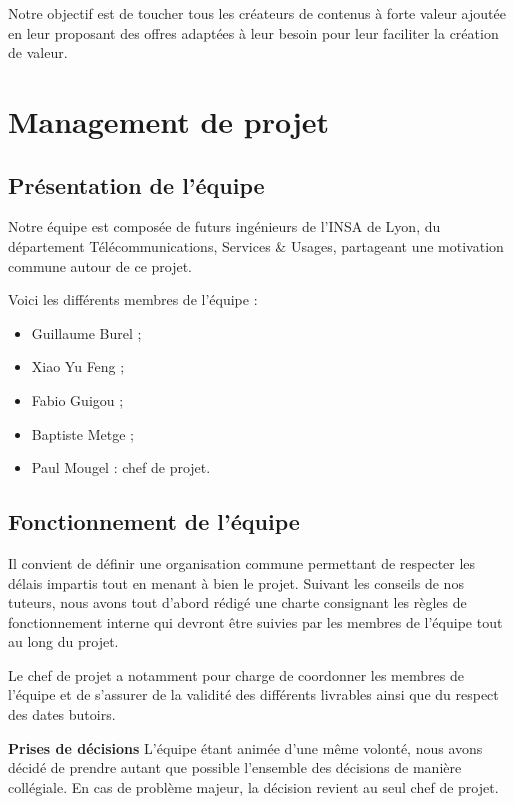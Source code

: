 \documentclass[10pt,twocolumn,a4paper,utf8x]{article}
\begin{document}
Notre objectif est de toucher tous les créateurs de contenus à forte
valeur ajoutée en leur proposant des offres adaptées à leur besoin pour
leur faciliter la création de valeur.

\section{Management de projet}

\subsection{Présentation de l'équipe}

Notre équipe est composée de futurs ingénieurs de l'INSA de Lyon, du
département Télécommunications, Services \& Usages, partageant une
motivation commune autour de ce projet.

Voici les différents membres de l'équipe :

\begin{itemize}
\itemsep1pt\parskip0pt
\item
  Guillaume Burel ;
\item
  Xiao Yu Feng ;
\item
  Fabio Guigou ;
\item
  Baptiste Metge ;
\item
  Paul Mougel : chef de projet.
\end{itemize}

\subsection{Fonctionnement de l'équipe}

Il convient de définir une organisation commune permettant de respecter
les délais impartis tout en menant à bien le projet. Suivant les
conseils de nos tuteurs, nous avons tout d'abord rédigé une charte
consignant les règles de fonctionnement interne qui devront être suivies
par les membres de l'équipe tout au long du projet.

Le chef de projet a notamment pour charge de coordonner les membres de
l'équipe et de s'assurer de la validité des différents livrables ainsi
que du respect des dates butoirs.

\textbf{Prises de décisions} L'équipe étant animée d'une même volonté,
nous avons décidé de prendre autant que possible l'ensemble des
décisions de manière collégiale. En cas de problème majeur, la décision
revient au seul chef de projet.
\end{document}
